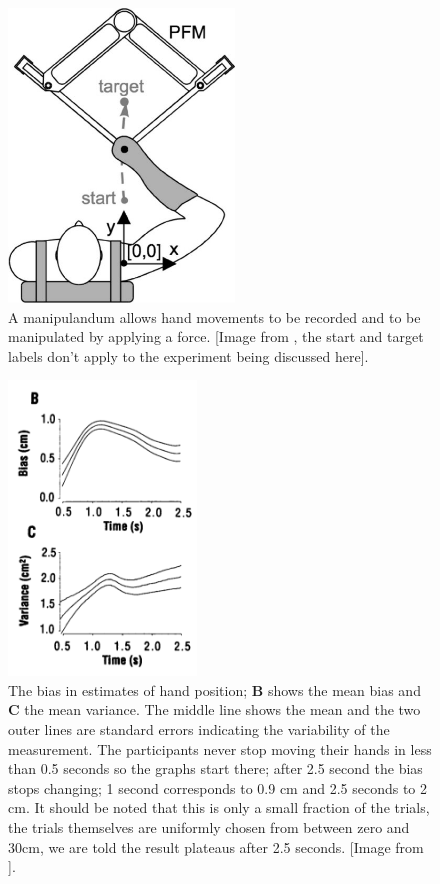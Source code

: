 \documentclass[12pt]{article}
\begin{document}
\begin{figure}
\begin{center}
  \includegraphics[width=6cm]{manipulandum.jpg}
\end{center}
\caption{A manipulandum allows hand movements to be recorded and to be
  manipulated by applying a force. [Image from \cite{MistryEt2013},
    the start and target labels don't apply to the experiment being
    discussed here].\label{fig_manipulandum}}
\end{figure}


\begin{figure}
\begin{center}
  \includegraphics[width=5cm]{fig_overestimate.png}
\end{center}
\caption{The bias in estimates of hand position; \textbf{B} shows the
  mean bias and \textbf{C} the mean variance. The middle line shows
  the mean and the two outer lines are standard errors indicating the
  variability of the measurement. The participants never stop moving
  their hands in less than 0.5 seconds so the graphs start there;
  after 2.5 second the bias stops changing; 1 second corresponds to
  0.9 cm and 2.5 seconds to 2 cm. It should be noted that this is only
  a small fraction of the trials, the trials themselves are uniformly
  chosen from between zero and 30cm, we are told the result plateaus after 2.5 seconds. [Image from
    \cite{WolpertEtAl1995}].\label{fig_overestimate}}
\end{figure}
\end{document}
